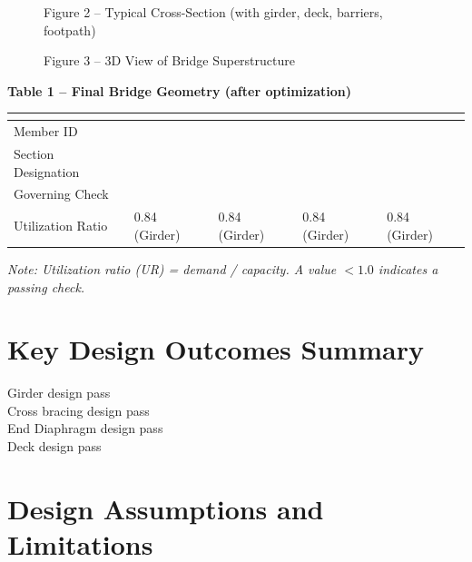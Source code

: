 \documentclass[12pt,a4paper]{report}
\numberwithin{table}{chapter}
\numberwithin{figure}{chapter}
\begin{document}
\begin{figure}[H]
\centering
{}
\caption*{Figure 2 -- Typical Cross-Section (with girder, deck, barriers, footpath)}
\end{figure}

\begin{figure}[H]
\centering
{}
\caption*{Figure 3 -- 3D View of Bridge Superstructure}
\end{figure}

\noindent\textbf{Table 1 -- Final Bridge Geometry (after optimization)}

\vspace{0.4em}
\noindent
\begin{tabular}{|C{2.8cm}|C{3.0cm}|C{3.0cm}|C{3.0cm}|C{3.0cm}|}
\hline
  \textbf{} &
  \textbf{} &
  \textbf{} &
  \textbf{} &
  \textbf{} \\
\hline
Member ID &  &  &  &  \\
\hline
Section Designation &  &  &  &  \\
\hline
Governing Check &  &  &  &  \\
\hline
Utilization Ratio & 0.84 (Girder) & 0.84 (Girder) & 0.84 (Girder) & 0.84 (Girder) \\
\hline
\end{tabular}

\vspace{0.4em}
\noindent\textit{Note: Utilization ratio (UR) = demand / capacity. A value $< 1.0$ indicates a passing check.}

\vspace{1em}

\section*{Key Design Outcomes Summary}
\label{sec:key-outcomes}

\noindent Girder design pass \\
Cross bracing design pass \\
End Diaphragm design pass \\
Deck design pass

\section*{Design Assumptions and Limitations}
\label{sec:assumptions}
\end{document}
